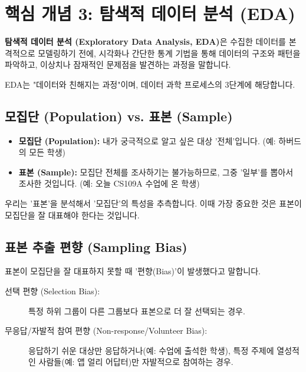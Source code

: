 \documentclass[11pt,a4paper]{book}
\theoremstyle{definition}
\begin{document}
\section{핵심 개념 3: 탐색적 데이터 분석 (EDA)}

\textbf{탐색적 데이터 분석 (Exploratory Data Analysis, EDA)}은 수집한 데이터를 본격적으로 모델링하기 전에,
시각화나 간단한 통계 기법을 통해 데이터의 구조와 패턴을 파악하고,
이상치나 잠재적인 문제점을 발견하는 과정을 말합니다.

EDA는 "데이터와 친해지는 과정"이며, 데이터 과학 프로세스의 3단계에 해당합니다.

\subsection{모집단 (Population) vs. 표본 (Sample)}

\begin{itemize}
    \item \textbf{모집단 (Population):} 내가 궁극적으로 알고 싶은 대상 '전체'입니다. (예: 하버드의 모든 학생)
    \item \textbf{표본 (Sample):} 모집단 전체를 조사하기는 불가능하므로, 그중 '일부'를 뽑아서 조사한 것입니다. (예: 오늘 CS109A 수업에 온 학생)
\end{itemize}

우리는 '표본'을 분석해서 '모집단'의 특성을 추측합니다.
이때 가장 중요한 것은 표본이 모집단을 잘 대표해야 한다는 것입니다.

\subsection{표본 추출 편향 (Sampling Bias)}

표본이 모집단을 잘 대표하지 못할 때 '편향(Bias)'이 발생했다고 말합니다.

\begin{description}
    \item[선택 편향 (Selection Bias):] 특정 하위 그룹이 다른 그룹보다 표본으로 더 잘 선택되는 경우.
    \item[무응답/자발적 참여 편향 (Non-response/Volunteer Bias):]
    응답하기 쉬운 대상만 응답하거나(예: 수업에 출석한 학생),
    특정 주제에 열성적인 사람들(예: 앱 얼리 어답터)만 자발적으로 참여하는 경우.
\end{description}
\end{document}
